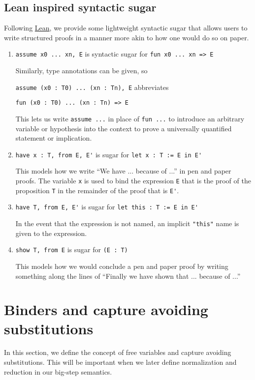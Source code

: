 \documentclass{article}
\begin{document}
\subsection{Lean inspired syntactic sugar}
Following \href{https://leanprover.github.io/reference/expressions.html#structured-proofs}
{Lean}, we provide some lightweight syntactic sugar that allows users to write
structured proofs in a manner more akin to how one would do so on paper.

\begin{enumerate}
  \item \verb|assume x0 ... xn, E| is syntactic sugar for \verb|fun x0 ... xn => E| 

  Similarly, type annotations can be given, so

  \verb|assume (x0 : T0) ... (xn : Tn), E| abbreviates
  
  \verb|fun (x0 : T0) ... (xn : Tn) => E|

  This lets us write \verb|assume ...| in place of \verb|fun ...| to introduce an 
  arbitrary variable or hypothesis into the context to prove a universally
  quantified statement or implication.

  \item \verb|have x : T, from E, E'| is sugar for \verb|let x : T := E in E'|

  This models how we write ``We have ... because of ...'' in pen and paper proofs.
  The variable \verb|x| is used to bind the expression \verb|E| that is the proof
  of the proposition \verb|T| in the remainder of the proof that is \verb|E'|. 

  \item \verb|have T, from E, E'| is sugar for \verb|let this : T := E in E'|

  In the event that the expression is not named, an implicit \verb|"this"| name is
  given to the expression.

  \item \verb|show T, from E| is sugar for \verb|(E : T)|

  This models how we would conclude a pen and paper proof by writing something
  along the lines of ``Finally we have shown that ... because of ...'' 
\end{enumerate}


\section{Binders and capture avoiding substitutions}
In this section, we define the concept of free variables and capture avoiding
substitutions. 
This will be important when we later define normalization and
reduction in our big-step semantics.
\end{document}

